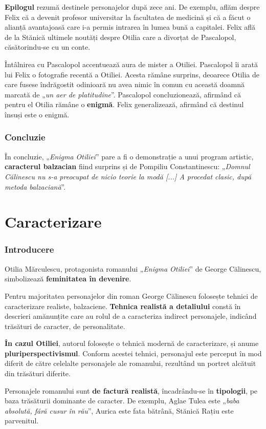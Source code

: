 \documentclass{article}
\newcommand{\qu}[1]{„\emph{#1}”}
\begin{document}
\textbf{Epilogul} rezumă destinele personajelor după zece ani. De exemplu, aflăm despre Felix că a devenit profesor universitar la facultatea de medicină și că a făcut o alianță avantajoasă care i-a permis intrarea în lumea bună a capitalei. Felix află de la Stănică ultimele noutăți despre Otilia care a divorțat de Pascalopol, căsătorindu-se cu un conte.

Întâlnirea cu Pascalopol accentuează aura de mister a Otiliei. Pascalopol îi arată lui Felix o fotografie recentă a Otiliei. Acesta rămâne surprins, deoarece Otilia de care fusese îndrăgostit odinioară nu avea nimic în comun cu această doamnă marcată de \qu{un aer de platitudine}. Pascalopol concluzionează, afirmând că pentru el Otilia rămâne o \textbf{enigmă}. Felix generalizează, afirmând că destinul însuși este o enigmă.
\section{Concluzie}
În concluzie, \qu{Enigma Otiliei} pare a fi o demonstrație a unui program artistic, \textbf{caracterul balzacian} fiind surprins și de Pompiliu Constantinescu: \qu{Domnul Călinescu nu s-a preocupat de nicio teorie la modă [...] A procedat clasic, după metoda balzaciană}.
\part*{Caracterizare}
\setcounter{section}{0}
\section{Introducere}
Otilia Mărculescu, protagonista romanului \qu{Enigma Otiliei} de George Călinescu, simbolizează \textbf{feminitatea în devenire}.

Pentru majoritatea personajelor din roman George Călinescu folosește tehnici de caracterizare realiste, balzaciene. \textbf{Tehnica realistă a detaliului} constă în descrieri amănunțite care au rolul de a caracteriza indirect personajele, indicând trăsături de caracter, de personalitate.

\textbf{În cazul Otiliei}, autorul folosește o tehnică modernă de caracterizare, și anume \textbf{pluriperspectivismul}. Conform acestei tehnici, personajul este perceput în mod diferit de către celelalte personajele ale romanului, rezultând un portret alcătuit din trăsături diferite.

Personajele romanului sunt \textbf{de factură realistă}, încadrându-se în \textbf{tipologii}, pe baza trăsăturii dominante de caracter. De exemplu, Aglae Tulea este \qu{baba absolută, fără cusur în rău}, Aurica este fata bătrână, Stănică Rațiu este parvenitul.
\end{document}
